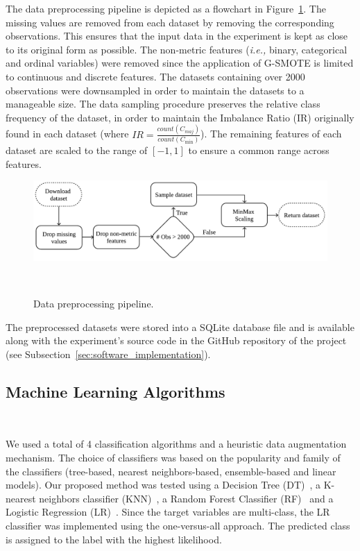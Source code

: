 \documentclass[parskip=full]{scrartcl}
\begin{document}
The data preprocessing pipeline is depicted as a flowchart in
Figure~\ref{fig:data_preprocessing}. The missing values are removed from each
dataset by removing the corresponding observations. This ensures that the
input data in the experiment is kept as close to its original form as
possible. The non-metric features (\textit{i.e.,} binary, categorical and
ordinal variables) were removed since the application of G-SMOTE is limited to
continuous and discrete features. The datasets containing over 2000
observations were downsampled in order to maintain the datasets to a
manageable size. The data sampling procedure preserves the relative class
frequency of the dataset, in order to maintain the Imbalance Ratio (IR)
originally found in each dataset (where $IR =
\frac{count(C_{maj})}{count(C_{\min})}$). The remaining features of each
dataset are scaled to the range of $[-1, 1]$ to ensure a common range across
features.

\begin{figure}[H]
	\centering
	\includegraphics[width=1\linewidth]{../analysis/data_preprocessing}
    \caption{%
        Data preprocessing pipeline.
    }~\label{fig:data_preprocessing}
\end{figure}

The preprocessed datasets were stored into a SQLite database file and is
available along with the experiment's source code in the GitHub repository of
the project (see Subsection~\ref{sec:software_implementation}).

\subsection{Machine Learning Algorithms}~\label{sec:machine_learning_algorithms}

We used a total of 4 classification algorithms and a heuristic data
augmentation mechanism. The choice of classifiers was based on the popularity
and family of the classifiers (tree-based, nearest neighbors-based,
ensemble-based and linear models). Our proposed method was tested using a
Decision Tree (DT)~\cite{Wu1975}, a K-nearest neighbors classifier
(KNN)~\cite{Cover1967}, a Random Forest Classifier (RF)~\cite{Ho1995} and a
Logistic Regression (LR)~\cite{Nelder1972}. Since the target variables are
multi-class, the LR classifier was implemented using the one-versus-all
approach. The predicted class is assigned to the label with the highest
likelihood.
\end{document}
